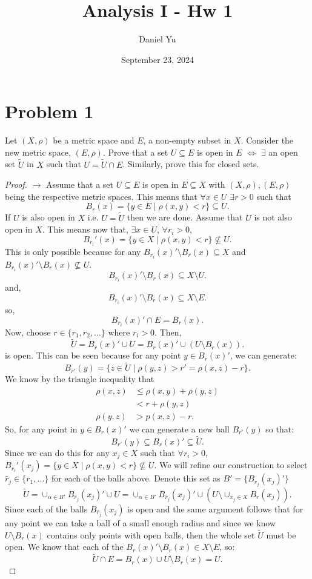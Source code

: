 \documentclass[a4paper]{article}
\title{\Huge{Analysis I - Hw 1}}
\author{\huge{Daniel Yu}}
\date{September 23, 2024}
\begin{document}
\maketitle
\newpage%
\pagebreak

\section{Problem 1}
Let $(X,\rho)$ be a metric space and  $E$, a non-empty subset in $X$. Consider the new metric space,
$(E,\rho)$. Prove that a set $U \subseteq E$ is open in $E$ $\iff$ $\exists $ an open set $\tilde{U}$ in $X$ 
such that  $U = \tilde{U} \cap E$. Similarly, prove this for closed sets.

\begin{proof}
  $\to$ Assume that a set $U \subseteq E$ is open in $E \subseteq X$ with $(X,\rho), (E,\rho)$ being the respective
  metric spaces. This means that $\forall x \in U$  $\exists r > 0$ such that 
\[
B_r(x) = \{y \in E \mid \rho(x,y) < r \}  \subseteq U
.\]
If $U$ is also open in $X$ i.e.  $U = \tilde{U}$ then we are done. Assume that  $U$ is not also open in $X$. This means now that, $\exists x \in U$,  $\forall r_i >0$,
\[
B_{r_i}'(x) = \{y \in X \mid \rho(x,y) < r\}  \not\subseteq U
.\] 
This is only possible because for any $B_{r_i}(x)' \setminus B_{r}(x) \subseteq X$ and $B_{r_i}(x)' \setminus B_r(x) \not\subseteq U$. 
\[
  B_{r_i}(x)' \setminus B_r(x) \subseteq X \setminus U 
.\]
and,
\[
B_{r_i}(x)' \setminus B_r(x) \subseteq X \setminus E
.\] 
so,
\[
B_{r_i}(x)' \cap E = B_r(x)
.\] 
Now, choose $r \in \{r_1, r_2, \ldots\}$ where $r_i > 0$. Then,
\[
  \tilde{U} = B_{r}(x)' \cup U = B_{r}(x)' \cup (U \setminus B_r(x))
.\] 
is open. This can be seen because for any point $y \in B_r(x)'$, we can generate:
\[
  B_{r'}(y) = \{z \in \tilde{U} \mid \rho(y,z) > r' = \rho(x,z) -r \} 
.\] 
We know by the triangle inequality that 
\begin{align*}
  \rho(x,z) &\leq \rho(x,y) + \rho(y,z) \\
            &< r + \rho(y,z) \\
  \rho(y,z) &>  p(x,z) -r  
.\end{align*}
So, for any point in  $y \in B_r(x)'$ we can generate a new ball $B_{r'}(y)$ so that:
\[
  B_{r'}(y) \subseteq B_r(x)' \subseteq \tilde{U}
.\] 
Since we can do this for any $x_j \in X$ such that  $\forall r_i > 0$,  $B_{r_i}'(x_j) = \{y \in X \mid \rho(x,y) < r \} \not\subseteq U$. We will refine our construction to select $\hat{r}_j \in \{r_1, \ldots\}$ for each of the balls above. Denote this set as $B' = \{B_{\hat{r}_j}(x_j)'\} $
\[
\tilde{U} = \cup_{\alpha \in B'} B_{\hat{r}_j}(x_j)' \cup U = \cup_{\alpha \in B'} B_{\hat{r}_j}(x_j)' \cup (U \setminus \cup_{x_j \in X} B_r(x_j)) 
.\]
Since each of the balls $B_{\hat{r}_j}(x_j)$ is open and the same argument follows that for any point we can take a ball of a small enough radius and since we know  $U \setminus B_r(x)$ contains only points with open balls, then
the whole set $\tilde{U}$ must be open. We know that each of the  $B_r(x)' \setminus B_r(x) \in X \setminus E$, 
so:
\[
  \tilde{U} \cap E = B_r(x) \cup U \setminus B_r(x) = U
.\] 


\end{proof}
\end{document}
